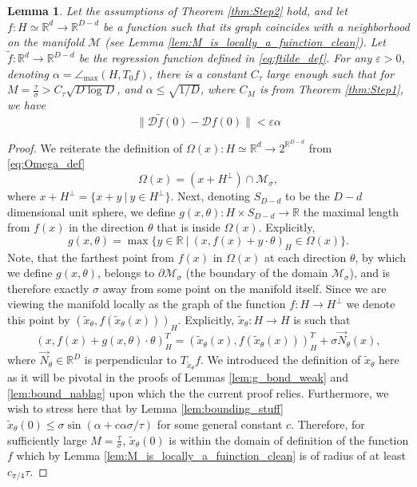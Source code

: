 \documentclass[12pt]{article}
\newtheorem{Lemma}[Theorem]{Lemma}
\theoremstyle{remark}
\newcommand{\RR}{\mathbb{R}}
\newcommand{\MM}{\mathcal{M}}
\newcommand{\DD}{\mathcal{D}}
\newcommand{\eps}{\varepsilon}
\newcommand{\wtilde}[1]{\widetilde{#1}}
\newcommand{\maxangle}{\angle_{\max}}
\newcommand{\stau}{\tau}
\newcommand{\sM}{{M}}
\begin{document}
\begin{appendices}
\begin{Lemma}\label{lem:bound_Df-Dfwtilde}
 Let the assumptions of Theorem \ref{thm:Step2} hold, and let $ f:H\simeq\RR^d\to\RR^{D-d} $ be a function such that its graph coincides with a neighborhood on the manifold $\MM$ (see Lemma \ref{lem:M_is_locally_a_fuinction_clean}). Let $\wtilde f:\RR^d\to\RR^{D-d} $ be the regression function   defined in \eqref{eq:ftilde_def}. 
 For any $\eps>0$, denoting $\alpha = \maxangle(H, T_0 f)$, there is a constant $C_\stau$ large enough such that for $M = \frac{\tau}{\sigma} >C_\stau\sqrt{D \log D}$, and $\alpha \leq \sqrt{1/D}$, where $C_\sM$ is from Theorem \ref{thm:Step1}, we have 
    \[
    \|\DD\wtilde{f}(0) - \DD f(0)\| < \eps \alpha
    \]
\end{Lemma}
\begin{proof}
We reiterate the definition of $\Omega(x):H \simeq \RR^d \to 2^{\RR^{D-d}}$ from \eqref{eq:Omega_def}
\begin{equation*}
\Omega(x) = (x + H^\perp) \cap  \MM_\sigma
,    
\end{equation*}
where $x + H^\perp = \{x + y ~|~ y\in H^\perp\}$.
Next, denoting $S_{D-d}$ to be the $D-d$ dimensional unit sphere, we define $g(x, \theta):H\times S_{D-d}\to \RR$ the maximal length from $f(x)$ in the direction $\theta$ that is inside $\Omega(x)$.
Explicitly,
\begin{equation}\label{eq:g_def}
g(x, \theta) = \max\{y\in \RR ~|~ (x,f(x) + y\cdot \theta)_H  \in \Omega(x)\}
.    
\end{equation}
Note, that the farthest point from $f(x)$ in $\Omega(x)$ at each direction $\theta$, by which we define $g(x, \theta)$, belongs to $\partial\MM_\sigma$ (the boundary of the domain $\MM_\sigma$), and is therefore exactly $\sigma$ away from some point on the manifold itself.
Since we are viewing the manifold locally as the graph of the function $f:H\to H^\perp$ we denote this point by $(\wtilde x_\theta, f(\wtilde x_\theta(x)))_H$.
Explicitly, $\wtilde{x}_\theta:H \to H$ is such that
\begin{equation}\label{eq:x_tilde_def}
    (x ,f(x) + g(x, \theta) \cdot \theta)_H^T  = (\wtilde x_\theta(x), f(\wtilde x_\theta(x)))_H^T + \sigma \vec N_\theta (x)
,\end{equation}
where $\vec N_\theta \in \RR^D$ is perpendicular to $T_{\wtilde x_\theta}f$.
We introduced the definition of $\wtilde{x}_\theta$ here as it will be pivotal in the proofs of Lemmas \ref{lem:g_bond_weak} and \ref{lem:bound_nablag} upon which the the current proof relies.
Furthermore, we wish to stress here that by Lemma \ref{lem:bounding_stuff} $\wtilde x_\theta(0) \leq \sigma \sin (\alpha + c\alpha\sigma/\tau)$ for some general constant $c$.
Therefore, for sufficiently large $M = \frac{\tau}{\sigma}$, $\wtilde x_\theta(0)$ is within the domain of definition of the function $f$ which by Lemma \ref{lem:M_is_locally_a_fuinction_clean} is of radius of at least $c_{\pi/4}\tau$.


\end{proof}
\end{appendices}
\end{document}
